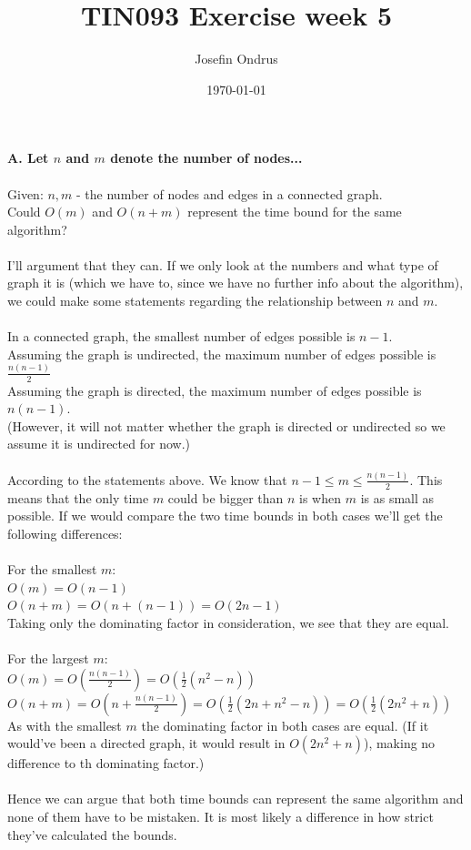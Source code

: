\documentclass[12pt,oneside,reqno]{amsart}
\begin{document}
\setlength{\parindent}{6pt}
\def\code#1{\texttt{#1}} %

\title{TIN093 Exercise week 5}
\author{Josefin Ondrus}
\date{\today}
\maketitle

\textbf{A. Let $n$ and $m$ denote the number of nodes...}\\\\
Given: $n,m$ - the number of nodes and edges in a connected graph.\\
Could $O(m)$ and $O(n+m)$ represent the time bound for the same algorithm?\\\\
I'll argument that they can. If we only look at the numbers and what type of graph it is (which we have to, since we have no further info about the algorithm), we could make some statements regarding the relationship between $n$ and $m$.\\\\
In a connected graph, the smallest number of edges possible is $n-1$.\\
Assuming the graph is undirected, the maximum number of edges possible is $\frac{n(n-1)}{2}$\\
Assuming the graph is directed, the maximum number of edges possible is $n(n-1)$.\\
(However, it will not matter whether the graph is directed or undirected so we assume it is undirected for now.)\\\\
According to the statements above. We know that $n-1 \leq m \leq \frac{n(n-1)}{2}$. This means that the only time $m$ could be bigger than $n$ is when $m$ is as small as possible. If we would compare the two time bounds in both cases we'll get the following differences:\\\\
For the smallest $m$:\\
$O(m)=O(n-1)$\\
$O(n+m)=O(n+(n-1))=O(2n-1)$\\
Taking only the dominating factor in consideration, we see that they are equal.\\\\
For the largest $m$:\\
$O(m)=O(\frac{n(n-1)}{2})=O(\frac{1}{2}(n^2-n))$\\
$O(n+m)=O(n+\frac{n(n-1)}{2})=O(\frac{1}{2}(2n+n^2-n))=O(\frac{1}{2}(2n^2+n))$\\ 
As with the smallest $m$ the dominating factor in both cases are equal. (If it would've been a directed graph, it would result in $O(2n^2+n)$), making no difference to th dominating factor.)\\\\
Hence we can argue that both time bounds can represent the same algorithm and none of them have to be mistaken. It is most likely a difference in how strict they've calculated the bounds. 
\end{document}
